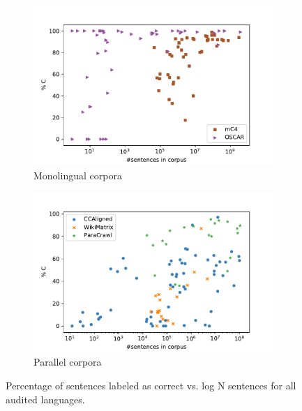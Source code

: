 \begin{figure}
    \centering
    \begin{subfigure}{.5\textwidth}
        \centering
        \includegraphics[width=\linewidth]{static/media/data/quality/C_mono.pdf}
        \caption{Monolingual corpora}
        \label{fig:C_mono}
    \end{subfigure}%
    \begin{subfigure}{.5\textwidth}
        \centering
        \includegraphics[width=\linewidth]{static/media/data/quality/C_para.pdf}
        \caption{Parallel corpora}
        \label{fig:C_para}
    \end{subfigure}
    \caption{Percentage of sentences labeled as correct vs. log N sentences for all audited languages.}
    \label{fig:C}
\end{figure}

